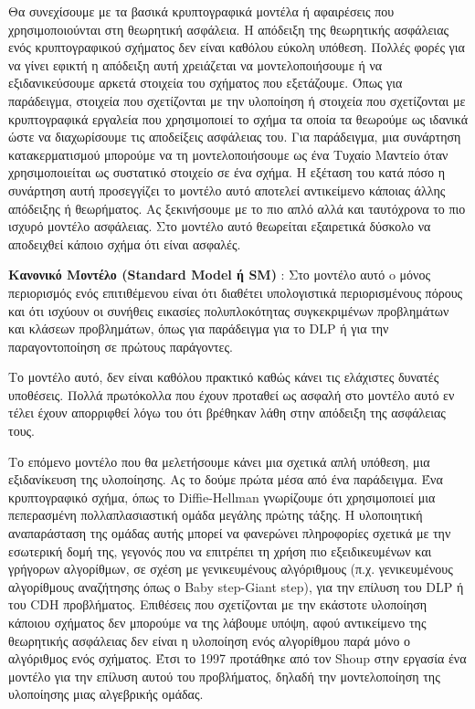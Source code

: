 Θα συνεχίσουμε με τα βασικά κρυπτογραφικά μοντέλα ή αφαιρέσεις που χρησιμοποιούνται στη θεωρητική ασφάλεια. Η απόδειξη της θεωρητικής ασφάλειας ενός κρυπτογραφικού σχήματος δεν είναι καθόλου εύκολη υπόθεση. Πολλές φορές για να γίνει εφικτή η απόδειξη αυτή χρειάζεται να μοντελοποιήσουμε ή να εξιδανικεύσουμε αρκετά στοιχεία του σχήματος που εξετάζουμε. Όπως για παράδειγμα, στοιχεία που σχετίζονται με την υλοποίηση ή στοιχεία που σχετίζονται με κρυπτογραφικά εργαλεία που χρησιμοποιεί το σχήμα τα οποία τα θεωρούμε ως ιδανικά ώστε να διαχωρίσουμε τις αποδείξεις ασφάλειας του. Για παράδειγμα, μια συνάρτηση κατακερματισμού μπορούμε να τη μοντελοποιήσουμε ως ένα Τυχαίο Μαντείο όταν χρησιμοποιείται ως συστατικό στοιχείο σε ένα σχήμα. Η εξέταση του κατά πόσο η συνάρτηση αυτή προσεγγίζει το μοντέλο αυτό αποτελεί αντικείμενο κάποιας άλλης απόδειξης ή θεωρήματος. Ας ξεκινήσουμε με το πιο απλό αλλά και ταυτόχρονα το πιο ισχυρό μοντέλο ασφάλειας. Στο μοντέλο αυτό θεωρείται εξαιρετικά δύσκολο να αποδειχθεί κάποιο σχήμα ότι είναι ασφαλές.

\begin{definition}
\textbf{Κανονικό Μοντέλο (Standard Model ή SM)} : Στο μοντέλο αυτό o μόνος περιορισμός ενός επιτιθέμενου είναι ότι διαθέτει υπολογιστικά περιορισμένους πόρους και ότι ισχύουν οι συνήθεις εικασίες πολυπλοκότητας συγκεκριμένων προβλημάτων και κλάσεων προβλημάτων, όπως για παράδειγμα για το DLP ή για την παραγοντοποίηση σε πρώτους παράγοντες.
\end{definition}

Το μοντέλο αυτό, δεν είναι καθόλου πρακτικό καθώς κάνει τις ελάχιστες δυνατές υποθέσεις. Πολλά πρωτόκολλα που έχουν προταθεί ως ασφαλή στο μοντέλο αυτό εν τέλει έχουν απορριφθεί λόγω του ότι βρέθηκαν λάθη στην απόδειξη της ασφάλειας τους.

Το επόμενο μοντέλο που θα μελετήσουμε κάνει μια σχετικά απλή υπόθεση, μια εξιδανίκευση της υλοποίησης. Ας το δούμε πρώτα μέσα από ένα παράδειγμα. Ένα κρυπτογραφικό σχήμα, όπως το Diffie-Hellman γνωρίζουμε ότι χρησιμοποιεί μια πεπερασμένη πολλαπλασιαστική ομάδα μεγάλης πρώτης τάξης. Η υλοποιητική αναπαράσταση της ομάδας αυτής μπορεί να φανερώνει πληροφορίες σχετικά με την εσωτερική δομή της, γεγονός που να επιτρέπει τη χρήση πιο εξειδικευμένων και γρήγορων αλγορίθμων, σε σχέση με γενικευμένους αλγόριθμους (π.χ. γενικευμένους αλγορίθμους αναζήτησης όπως ο Baby step-Giant step), για την επίλυση του DLP ή του CDH προβλήματος. Επιθέσεις που σχετίζονται με την εκάστοτε υλοποίηση κάποιου σχήματος δεν μπορούμε να της λάβουμε υπόψη, αφού αντικείμενο της θεωρητικής ασφάλειας δεν είναι η υλοποίηση ενός αλγορίθμου παρά μόνο ο αλγόριθμος ενός σχήματος. Έτσι το 1997 προτάθηκε από τον Shoup στην εργασία \cite{shoup1997lower} ένα μοντέλο για την επίλυση αυτού του προβλήματος, δηλαδή την μοντελοποίηση της υλοποίησης μιας αλγεβρικής ομάδας.

